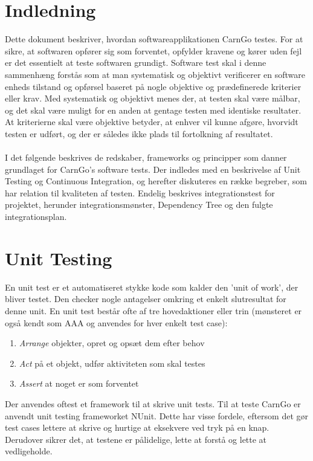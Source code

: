 \documentclass[a4paper,12pt,fleqn,oneside]{article}
\begin{document}

\newpage
\tableofcontents
\newpage

\section{Indledning}
Dette dokument beskriver, hvordan softwareapplikationen CarnGo testes. For at sikre, at softwaren opfører sig som forventet, opfylder kravene og kører uden fejl er det essentielt at teste softwaren grundigt. Software test skal i denne sammenhæng forstås som at man systematisk og objektivt verificerer en software enheds tilstand og opførsel baseret på nogle objektive og prædefinerede kriterier eller krav. Med systematisk og objektivt menes der, at testen skal være målbar, og det skal være muligt for en anden at gentage testen med identiske resultater. At kriterierne skal være objektive betyder, at enhver vil kunne afgøre, hvorvidt testen er udført, og der er således ikke plads til fortolkning af resultatet. 
\\\\I det følgende beskrives de redskaber, frameworks og principper som danner grundlaget for CarnGo's software tests. Der indledes med en beskrivelse af Unit Testing og Continuous Integration, og herefter diskuteres en række begreber, som har relation til kvaliteten af testen. Endelig beskrives integrationstest for projektet, herunder integrationsmønster, Dependency Tree og den fulgte integrationsplan.

\section{Unit Testing}
En unit test er et automatiseret stykke kode som kalder den 'unit of work', der bliver testet. Den checker nogle antagelser omkring et enkelt slutresultat for denne unit. En unit test består ofte af tre hovedaktioner eller trin (mønsteret er også kendt som AAA og anvendes for hver enkelt test case):
\begin{enumerate}
    \item \textit{Arrange} objekter, opret og opsæt dem efter behov
    \item \textit{Act} på et objekt, udfør aktiviteten som skal testes
    \item \textit{Assert} at noget er som forventet
\end{enumerate}
Der anvendes oftest et framework til at skrive unit tests. Til at teste CarnGo er anvendt unit testing frameworket NUnit. Dette har visse fordele, eftersom det gør test cases lettere at skrive og hurtige at eksekvere ved tryk på en knap. Derudover sikrer det, at testene er pålidelige, lette at forstå og lette at vedligeholde. 
\end{document}
